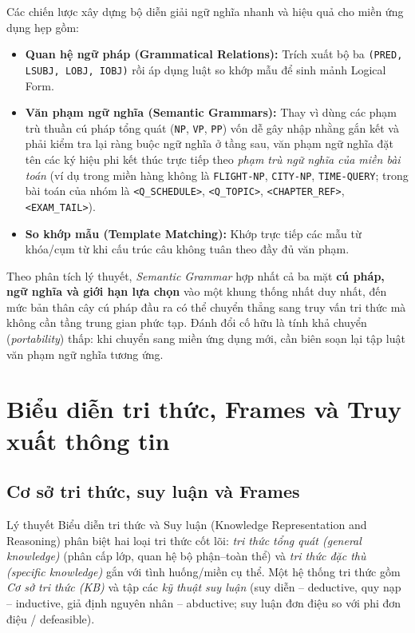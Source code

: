 Các chiến lược xây dựng bộ diễn giải ngữ nghĩa nhanh và hiệu quả cho miền ứng dụng hẹp gồm:
\begin{itemize}
  \item \textbf{Quan hệ ngữ pháp (Grammatical Relations):} Trích xuất bộ ba \texttt{(PRED, LSUBJ, LOBJ, IOBJ)} rồi áp dụng luật so khớp mẫu để sinh mảnh Logical Form.
  \item \textbf{Văn phạm ngữ nghĩa (Semantic Grammars):} Thay vì dùng các phạm trù thuần cú pháp tổng quát (\texttt{NP}, \texttt{VP}, \texttt{PP}) vốn dễ gây nhập nhằng gắn kết và phải kiểm tra lại ràng buộc ngữ nghĩa ở tầng sau, văn phạm ngữ nghĩa đặt tên các ký hiệu phi kết thúc trực tiếp theo \emph{phạm trù ngữ nghĩa của miền bài toán} (ví dụ trong miền hàng không là \texttt{FLIGHT-NP}, \texttt{CITY-NP}, \texttt{TIME-QUERY}; trong bài toán của nhóm là \texttt{<Q\_SCHEDULE>}, \texttt{<Q\_TOPIC>}, \texttt{<CHAPTER\_REF>}, \texttt{<EXAM\_TAIL>}).
  \item \textbf{So khớp mẫu (Template Matching):} Khớp trực tiếp các mẫu từ khóa/cụm từ khi cấu trúc câu không tuân theo đầy đủ văn phạm.
\end{itemize}

Theo phân tích lý thuyết, \emph{Semantic Grammar} hợp nhất cả ba mặt \textbf{cú pháp, ngữ nghĩa và giới hạn lựa chọn} vào một khung thống nhất duy nhất, đến mức bản thân cây cú pháp đầu ra có thể chuyển thẳng sang truy vấn tri thức mà không cần tầng trung gian phức tạp. Đánh đổi cố hữu là tính khả chuyển (\emph{portability}) thấp: khi chuyển sang miền ứng dụng mới, cần biên soạn lại tập luật văn phạm ngữ nghĩa tương ứng.

\section{Biểu diễn tri thức, Frames và Truy xuất thông tin}

\subsection{Cơ sở tri thức, suy luận và Frames}

Lý thuyết Biểu diễn tri thức và Suy luận (Knowledge Representation and Reasoning) phân biệt hai loại tri thức cốt lõi: \emph{tri thức tổng quát (general knowledge)} (phân cấp lớp, quan hệ bộ phận--toàn thể) và \emph{tri thức đặc thù (specific knowledge)} gắn với tình huống/miền cụ thể. Một hệ thống tri thức gồm \emph{Cơ sở tri thức (KB)} và tập các \emph{kỹ thuật suy luận} (suy diễn -- deductive, quy nạp -- inductive, giả định nguyên nhân -- abductive; suy luận đơn điệu so với phi đơn điệu / defeasible).

